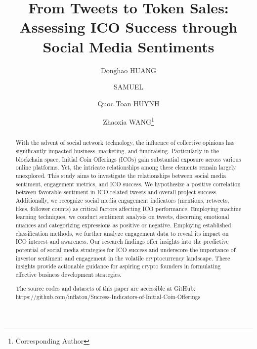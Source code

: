 \documentclass[runningheads]{llncs}
\begin{document}
%
\title{From Tweets to Token Sales: Assessing ICO Success through Social Media Sentiments}
%
%

\author{Donghao HUANG \and
SAMUEL \and 
Quoc Toan HUYNH \and
Zhaoxia WANG\thanks{Corresponding Author}}

%
%
%

\maketitle              %
%
\begin{abstract}

With the advent of social network technology, the influence of collective opinions has significantly impacted business, marketing, and fundraising. Particularly in the blockchain space, Initial Coin Offerings (ICOs) gain substantial exposure across various online platforms. Yet, the intricate relationships among these elements remain largely unexplored. This study aims to investigate the relationships between social media sentiment, engagement metrics, and ICO success. We hypothesize a positive correlation between favorable sentiment in ICO-related tweets and overall project success. Additionally, we recognize social media engagement indicators (mentions, retweets, likes, follower counts) as critical factors affecting ICO performance. Employing machine learning techniques, we conduct sentiment analysis on tweets, discerning emotional nuances and categorizing expressions as positive or negative. Employing established classification methods, we further analyze engagement data to reveal its impact on ICO interest and awareness. Our research findings offer insights into the predictive potential of social media strategies for ICO success and underscore the importance of investor sentiment and engagement in the volatile cryptocurrency landscape. These insights provide actionable guidance for aspiring crypto founders in formulating effective business development strategies. 


The source codes and datasets of this paper are accessible at GitHub: https://github.com/inflaton/Success-Indicators-of-Initial-Coin-Offerings


\end{abstract}
\end{document}
